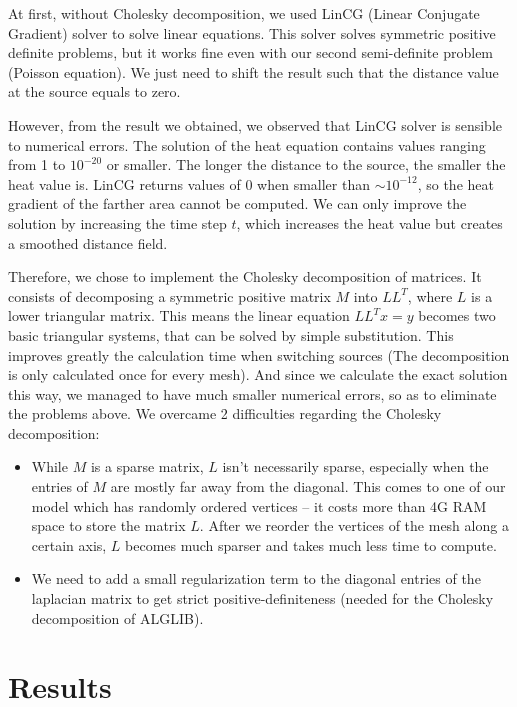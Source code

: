 \documentclass[a4paper,12pt,twoside]{article}
\begin{document}
At first, without Cholesky decomposition, we used LinCG (Linear Conjugate Gradient) solver to solve linear equations. This solver solves symmetric positive definite problems, but it works fine even with our second semi-definite problem (Poisson equation). We just need to shift the result such that the distance value at the source equals to zero.

However, from the result we obtained, we observed that LinCG solver is sensible to numerical errors. The solution of the heat equation contains values ranging from 1 to $10^{-20}$ or smaller. The longer the distance to the source, the smaller the heat value is. LinCG returns values of 0 when smaller than $\sim 10^{-12}$, so the heat gradient of the farther area cannot be computed. We can only improve the solution by increasing the time step $t$, which increases the heat value but creates a smoothed distance field.

Therefore, we chose to implement the Cholesky decomposition of matrices. It consists of decomposing a symmetric positive matrix $M$ into $LL^T$, where $L$ is a lower triangular matrix. This means the linear equation $LL^Tx = y$ becomes two basic triangular systems, that can be solved by simple substitution. This improves greatly the calculation time when switching sources (The decomposition is only calculated once for every mesh). And since we calculate the exact solution this way, we managed to have much smaller numerical errors, so as to eliminate the problems above. 
We overcame 2 difficulties regarding the Cholesky decomposition: 

\begin{itemize}
\item
While $M$ is a sparse matrix, $L$ isn’t necessarily sparse, especially when the entries of $M$ are mostly far away from the diagonal. This comes to one of our model which has randomly ordered vertices – it costs more than 4G RAM space to store the matrix $L$. After we reorder the vertices of the mesh along a certain axis, $L$ becomes much sparser and takes much less time to compute.
\item
We need to add a small regularization term to the diagonal entries of the laplacian matrix to get strict positive-definiteness (needed for the Cholesky decomposition of ALGLIB).
\end{itemize}

\section{Results}
\end{document}
